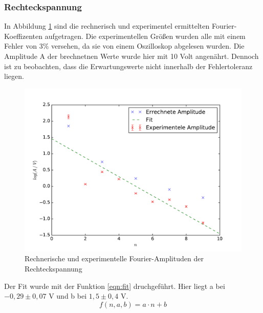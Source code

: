 \subsubsection{Rechteckspannung}
In Abbildung \ref{fig:pr} sind die rechnerisch und experimentel ermittelten Fourier-Koeffizenten aufgetragen. Die experimentellen Größen wurden alle mit einem Fehler
von 3\% versehen, da sie von einem Oszilloskop abgelesen wurden. Die Amplitude A der brechnetnen Werte wurde hier mit 10 Volt angenährt.
Dennoch ist zu beobachten, dass die Erwartungswerte nicht innerhalb der Fehlertoleranz liegen.
\begin{figure}
  \centering
  \includegraphics[width= \textwidth]{Plots/Rechteckplot.pdf}
  \caption{Rechnerische und experimentelle Fourier-Amplituden der Rechteckspannung}
  \label{fig:pr}
\end{figure}
\FloatBarrier
Der Fit wurde mit der Funktion \eqref{eqn:fit} druchgeführt. Hier liegt a bei $ -0,29 \pm 0,07$ V
und b bei $1,5 \pm 0,4 $ V.
\begin{equation}
  f(n , a , b) = a\cdot n + b
\label{eqn:fit}
\end{equation}
